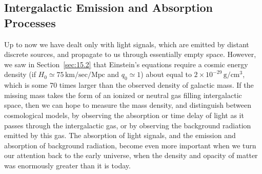 
\subsection{Intergalactic Emission and Absorption Processes}\label{sec:15.4}

Up to now we have dealt only with light signals, which are emitted by distant
discrete sources, and propagate to us through essentially empty space. However,
we saw in Section~\ref{sec:15.2} that Einstein's equations require a cosmic
energy density (if \(H_0\simeq75\,\mathrm{km/sec/Mpc}\) and \(q_0\simeq1\))
about equal to \(2\times10^{-29}\,\mathrm{g/cm^3}\), which is some 70 times
larger than the observed density of galactic mass. If the missing mass takes the
form of an ionized or neutral gas filling intergalactic space, then we can hope
to measure the mass density, and distinguish between cosmological models, by
observing the absorption or time delay of light as it passes through the
intergalactic gas, or by observing the background radiation emitted by this
gas. The absorption of light signals, and the emission and absorption of
background radiation, become even more important when we turn our attention
back to the early universe, when the density and opacity of matter was
enormously greater than it is today.

